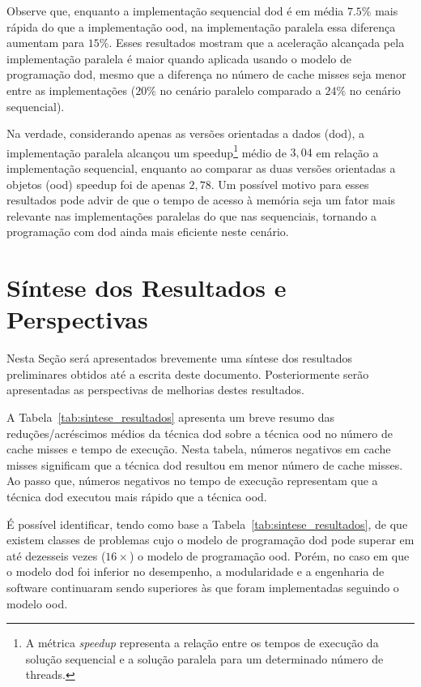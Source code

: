 Observe que, enquanto a implementação sequencial \ac{dod} é em média $ 7.5 \% $ mais rápida do que a implementação \ac{ood}, na implementação paralela essa diferença aumentam para $ 15 \% $.
Esses resultados mostram que a aceleração alcançada pela implementação paralela é maior quando aplicada usando o modelo de programação \ac{dod}, mesmo que a diferença no número de cache misses seja menor entre as implementações ($ 20 \% $ no cenário paralelo comparado a $ 24 \% $ no cenário sequencial).

Na verdade, considerando apenas as versões orientadas a dados (\ac{dod}), a implementação paralela alcançou um speedup\footnote{A métrica \textit{speedup} representa a relação entre os tempos de execução da solução sequencial e a solução paralela para um determinado número de threads.} médio de $ 3,04 $ em relação a implementação sequencial, enquanto ao comparar as duas versões  orientadas a objetos (\ac{ood}) speedup foi de apenas $ 2,78 $.
Um possível motivo para esses resultados pode advir de que o tempo de acesso à memória seja um fator mais relevante nas implementações paralelas do que nas sequenciais, tornando a programação com \ac{dod} ainda mais eficiente neste cenário.


\section{Síntese dos Resultados e Perspectivas}
\label{sec:sintese_resultado}

Nesta Seção será apresentados brevemente uma síntese dos resultados preliminares obtidos até a escrita deste documento. Posteriormente serão apresentadas as perspectivas de melhorias destes resultados.

A Tabela~\ref{tab:sintese_resultados} apresenta um breve resumo das reduções/acréscimos médios da técnica \ac{dod} sobre a técnica \ac{ood} no número de cache misses e tempo de execução.
Nesta tabela, números negativos em cache misses significam que a técnica \ac{dod} resultou em menor número de cache misses.
Ao passo que, números negativos no tempo de execução representam que a técnica \ac{dod} executou mais rápido que a técnica \ac{ood}. 

É possível identificar, tendo como base a Tabela~\ref{tab:sintese_resultados}, de que existem classes de problemas cujo o modelo de programação \ac{dod} pode superar em até dezesseis vezes ($16 \times$) o modelo de programação \ac{ood}. 
Porém, no caso em que o modelo \ac{dod} foi inferior no desempenho, a modularidade e a engenharia de software continuaram sendo superiores às que foram implementadas seguindo o modelo \ac{ood}.


